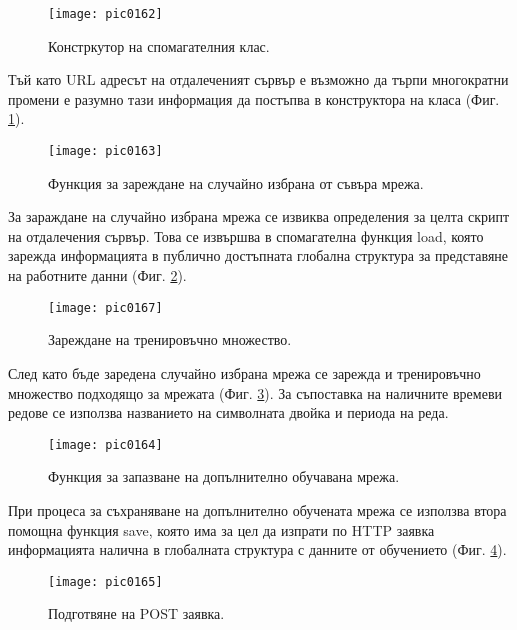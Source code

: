 \begin{figure}[h]
  \centering
  \texttt{[image: pic0162]}
  \caption{Констркутор на спомагателния клас.}
\label{fig:pic0162}
\end{figure}
\FloatBarrier

Тъй като URL адресът на отдалеченият сървър е възможно да търпи многократни промени е разумно тази информация да постъпва в конструктора на класа (Фиг. \ref{fig:pic0162}).

\begin{figure}[h]
  \centering
  \texttt{[image: pic0163]}
  \caption{Функция за зареждане на случайно избрана от съвъра мрежа.}
\label{fig:pic0163}
\end{figure}
\FloatBarrier

За зараждане на случайно избрана мрежа се извиква определения за целта скрипт на отдалечения сървър. Това се извършва в спомагателна функция load, която зарежда информацията в публично достъпната глобална структура за представяне на работните данни (Фиг. \ref{fig:pic0163}). 

\begin{figure}[h]
  \centering
  \texttt{[image: pic0167]}
  \caption{Зареждане на тренировъчно множество.}
\label{fig:pic0167}
\end{figure}
\FloatBarrier

След като бъде заредена случайно избрана мрежа се зарежда и тренировъчно множество подходящо за мрежата (Фиг. \ref{fig:pic0167}). За съпоставка на наличните времеви редове се използва названието на символната двойка и периода на реда. 

\begin{figure}[h]
  \centering
  \texttt{[image: pic0164]}
  \caption{Функция за запазване на допълнително обучавана мрежа.}
\label{fig:pic0164}
\end{figure}
\FloatBarrier

При процеса за съхраняване на допълнително обучената мрежа се използва втора помощна функция save, която има за цел да изпрати по HTTP заявка информацията налична в глобалната структура с данните от обучението (Фиг. \ref{fig:pic0164}). 

\begin{figure}[h]
  \centering
  \texttt{[image: pic0165]}
  \caption{Подготвяне на POST заявка.}
\label{fig:pic0165}
\end{figure}
\FloatBarrier

